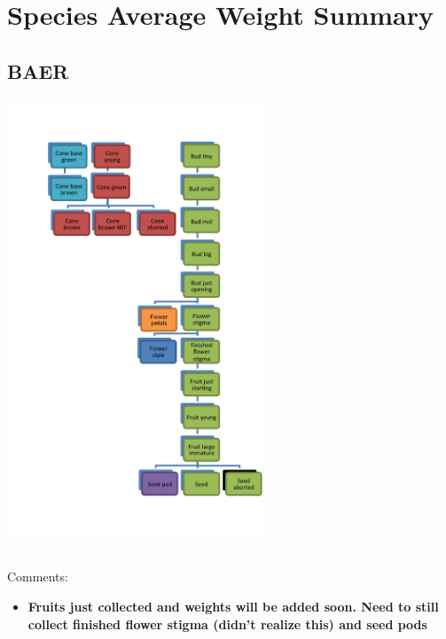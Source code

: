 \documentclass[10pt]{book} %
\begin{document}
\chapter{Species Average Weight Summary}
\newpage
\footnotesize



\clearpage
\newpage
\section{BAER}
\begin{multicols}{2}
\includegraphics[width=3in]{BAER.png}
\vfill
\columnbreak

\\Comments:
\begin{itemize}
\item \textbf{Fruits just collected and weights will be added soon.
Need to still collect finished flower stigma (didn't realize this) and seed pods}
\end{itemize}
\end{multicols}



\clearpage
\newpage
\end{document}
